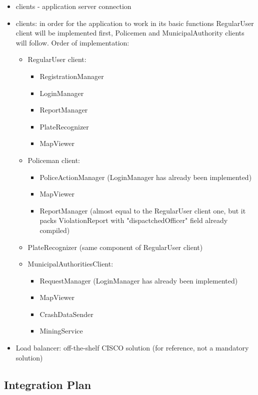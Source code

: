\begin{itemize}
	\item clients - application server connection
	\item clients: in order for the application to work in its basic functions RegularUser client will be implemented first, Policemen and MunicipalAuthority clients will follow.\newline
	Order of implementation:
		\begin{itemize}
			\item RegularUser client:
			\begin{itemize}
				\item RegistrationManager
				\item LoginManager
				\item ReportManager
				\item PlateRecognizer
				\item MapViewer
			\end{itemize}
			\newpage
			\item Policeman client:
			\begin{itemize}
				\item PoliceActionManager (LoginManager has already been implemented)
				\item MapViewer
				\item ReportManager (almost equal to the RegularUser client one, but it packs ViolationReport with "dispactchedOfficer" field already compiled)
			\end{itemize}
			\item PlateRecognizer (same component of RegularUser client)
			\item MunicipalAuthoritiesClient:
				\begin{itemize}
					\item RequestManager (LoginManager has already been implemented)
					\item MapViewer
					\item CrashDataSender
					\item MiningService
				\end{itemize} 
			\end{itemize}
	\item Load balancer: off-the-shelf CISCO solution (for reference, not a mandatory solution)
	\end{itemize} 

\subsection{Integration Plan}
